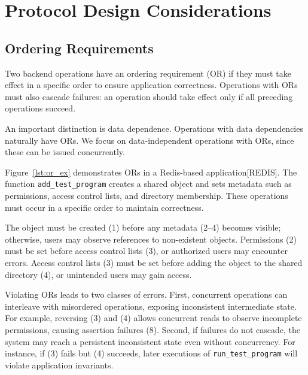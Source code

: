 \section{Protocol Design Considerations}

\subsection{Ordering Requirements}

Two backend operations have an ordering requirement (OR) if they must take effect in a specific order to ensure application correctness. Operations with ORs must also cascade failures: an operation should take effect only if all preceding operations succeed. 

An important distinction is data dependence. Operations with data dependencies naturally have ORs. We focus on data-independent operations with ORs, since these can be issued concurrently.

Figure~\ref{lst:or_ex} demonstrates ORs in a Redis-based application[REDIS]. The function \texttt{add\_test\_program} creates a shared object and sets metadata such as permissions, access control lists, and directory membership. These operations must occur in a specific order to maintain correctness.

The object must be created (1) before any metadata (2–4) becomes visible; otherwise, users may observe references to non-existent objects. Permissions (2) must be set before access control lists (3), or authorized users may encounter errors. Access control lists (3) must be set before adding the object to the shared directory (4), or unintended users may gain access.

Violating ORs leads to two classes of errors. First, concurrent operations can interleave with misordered operations, exposing inconsistent intermediate state. For example, reversing (3) and (4) allows concurrent reads to observe incomplete permissions, causing assertion failures (8). Second, if failures do not cascade, the system may reach a persistent inconsistent state even without concurrency. For instance, if (3) fails but (4) succeeds, later executions of \texttt{run\_test\_program} will violate application invariants.


